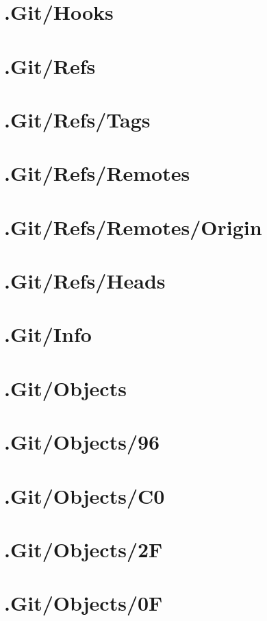 \section*{.Git/Hooks}

\section*{.Git/Refs}

\section*{.Git/Refs/Tags}

\section*{.Git/Refs/Remotes}

\section*{.Git/Refs/Remotes/Origin}

\section*{.Git/Refs/Heads}

\section*{.Git/Info}

\section*{.Git/Objects}

\section*{.Git/Objects/96}

\section*{.Git/Objects/C0}

\section*{.Git/Objects/2F}

\section*{.Git/Objects/0F}

